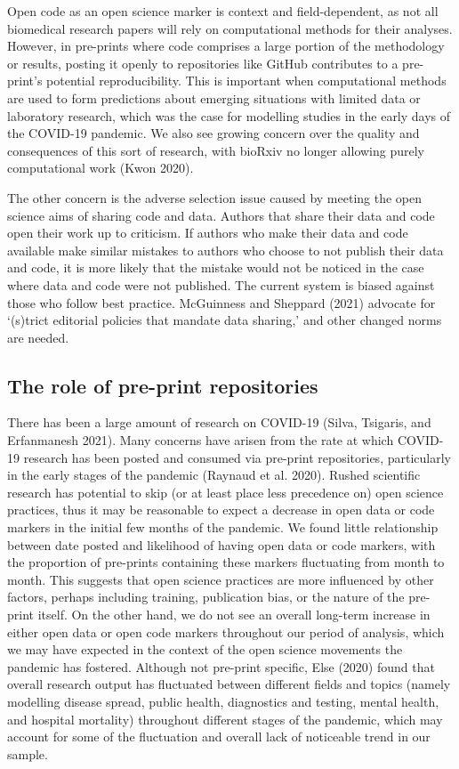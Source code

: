 \documentclass[
]{article}
\begin{document}
Open code as an open science marker is context and field-dependent, as not all biomedical research papers will rely on computational methods for their analyses. However, in pre-prints where code comprises a large portion of the methodology or results, posting it openly to repositories like GitHub contributes to a pre-print's potential reproducibility. This is important when computational methods are used to form predictions about emerging situations with limited data or laboratory research, which was the case for modelling studies in the early days of the COVID-19 pandemic. We also see growing concern over the quality and consequences of this sort of research, with bioRxiv no longer allowing purely computational work (Kwon 2020).

The other concern is the adverse selection issue caused by meeting the open science aims of sharing code and data. Authors that share their data and code open their work up to criticism. If authors who make their data and code available make similar mistakes to authors who choose to not publish their data and code, it is more likely that the mistake would not be noticed in the case where data and code were not published. The current system is biased against those who follow best practice. McGuinness and Sheppard (2021) advocate for `(s)trict editorial policies that mandate data sharing,' and other changed norms are needed.

\hypertarget{the-role-of-pre-print-repositories}{%
\subsection{The role of pre-print repositories}\label{the-role-of-pre-print-repositories}}

There has been a large amount of research on COVID-19 (Silva, Tsigaris, and Erfanmanesh 2021). Many concerns have arisen from the rate at which COVID-19 research has been posted and consumed via pre-print repositories, particularly in the early stages of the pandemic (Raynaud et al. 2020). Rushed scientific research has potential to skip (or at least place less precedence on) open science practices, thus it may be reasonable to expect a decrease in open data or code markers in the initial few months of the pandemic. We found little relationship between date posted and likelihood of having open data or code markers, with the proportion of pre-prints containing these markers fluctuating from month to month. This suggests that open science practices are more influenced by other factors, perhaps including training, publication bias, or the nature of the pre-print itself. On the other hand, we do not see an overall long-term increase in either open data or open code markers throughout our period of analysis, which we may have expected in the context of the open science movements the pandemic has fostered. Although not pre-print specific, Else (2020) found that overall research output has fluctuated between different fields and topics (namely modelling disease spread, public health, diagnostics and testing, mental health, and hospital mortality) throughout different stages of the pandemic, which may account for some of the fluctuation and overall lack of noticeable trend in our sample.
\end{document}
